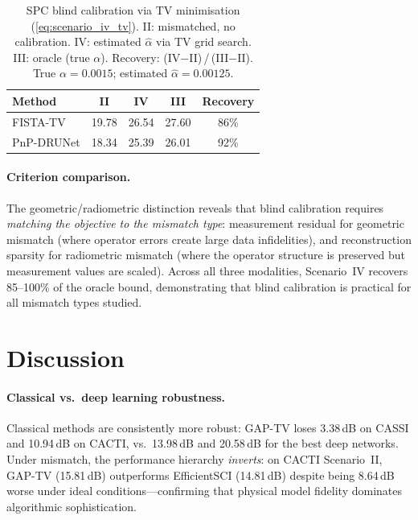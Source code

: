 \documentclass[runningheads]{llncs}
\begin{document}
\begin{table}[t]
\centering
\caption{SPC blind calibration via TV minimisation (\cref{eq:scenario_iv_tv}). II: mismatched, no calibration. IV: estimated $\hat{\alpha}$ via TV grid search. III: oracle (true $\alpha$). Recovery: (IV$-$II)\,/\,(III$-$II). True $\alpha{=}0.0015$; estimated $\hat{\alpha}{=}0.00125$.}
\label{tab:spc_scenario_iv}
\begin{tabular}{@{}lcccc@{}}
\toprule
\textbf{Method} & \textbf{II} & \textbf{IV} & \textbf{III} & \textbf{Recovery} \\
\midrule
FISTA-TV   & 19.78 & 26.54 & 27.60 & 86\% \\
PnP-DRUNet & 18.34 & 25.39 & 26.01 & 92\% \\
\bottomrule
\end{tabular}
\end{table}

\paragraph{Criterion comparison.}
The geometric/radiometric distinction reveals that blind calibration requires \emph{matching the objective to the mismatch type}: measurement residual for geometric mismatch (where operator errors create large data infidelities), and reconstruction sparsity for radiometric mismatch (where the operator structure is preserved but measurement values are scaled).
Across all three modalities, Scenario~IV recovers 85--100\% of the oracle bound, demonstrating that blind calibration is practical for all mismatch types studied.

\section{Discussion}
\label{sec:discussion}

\paragraph{Classical vs.\ deep learning robustness.}
Classical methods are consistently more robust: GAP-TV loses 3.38\,dB on CASSI and 10.94\,dB on CACTI, vs.\ 13.98\,dB and 20.58\,dB for the best deep networks.
Under mismatch, the performance hierarchy \emph{inverts}: on CACTI Scenario~II, GAP-TV (15.81\,dB) outperforms EfficientSCI (14.81\,dB) despite being 8.64\,dB worse under ideal conditions---confirming that physical model fidelity dominates algorithmic sophistication.
\end{document}
